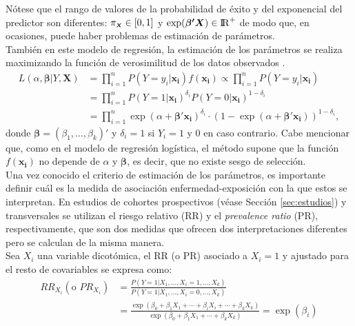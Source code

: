 Nótese que el rango de valores de la probabilidad de éxito y del exponencial del predictor son diferentes: $\pi_{\mathsmaller{\boldsymbol{X}}} \in [0,1] $ y $\exp(\boldsymbol{\beta'X}) \in {\rm I\!R}^{+}$ de modo que, en ocasiones, puede haber problemas de estimación de parámetros. \\

También en este modelo de regresión, la estimación de los parámetros se realiza maximizando la función de verosimilitud de los datos observados \autocite{Silvia}.
\begin{align*}
L(\alpha, \boldsymbol{\beta} | Y, \boldsymbol{X})
&=\prod_{i=1}^{n}P(Y=y_i|\boldsymbol{x_i})f(\boldsymbol{x_i})\propto \prod_{i=1}^{n}P(Y=y_i|\boldsymbol{x_i})\\[1ex]
& =\prod_{i=1}^{n}P(Y=1|\boldsymbol{x_i})^{\delta_i}P(Y=0|\boldsymbol{x_i})^{1-\delta_i} \\[1ex]
& =\prod_{i=1}^{n}\exp(\alpha + \boldsymbol{\beta'x_i})^{\delta_i} \cdot (1-\exp(\alpha + \boldsymbol{\beta'x_i}))^{1-\delta_i},
\end{align*}
donde $\boldsymbol{\beta}=(\beta_1, ..., \beta_k)'$ y $\delta_i=1$ si $Y_i=1$ y 0 en caso contrario. Cabe mencionar que, como en el modelo de regresión logística, el método supone 	que la función $f(\boldsymbol{x_i})$ no depende de $\alpha$ y $\boldsymbol{\beta}$, es decir, que no existe sesgo de selección. \\

Una vez conocido el criterio de estimación de los parámetros, es importante definir cuál es la medida de asociación enfermedad-exposición con la que estos se interpretan. En estudios de cohortes prospectivos (véase Sección \ref{sec:estudios}) y transversales se utilizan el riesgo relativo (RR) y el \textit{prevalence ratio} (PR), respectivamente, que son dos medidas que ofrecen dos interpretaciones diferentes pero se calculan de la misma manera. \\

Sea $X_i$ una variable dicotómica, el RR (o PR) asociado a $X_i=1$ y ajustado para el resto de covariables se expresa como:
\begin{align*}
RR_{X_i} (\text{o } PR_{X_i} )
&= \frac{P(Y=1|X_1,...  ,X_i=1,... , X_k)}{P(Y=1|X_1, ... ,X_i=0, ..., X_k)} \\[1.2ex]
&= \frac{\exp(\beta_0 + \beta_1X_1 + \cdots + \beta_iX_i + \cdots + \beta_kX_k)}{\exp(\beta_0 +\beta_1X_1+ \cdots + \beta_kX_k)}  = \exp(\beta_i)
\end{align*}

